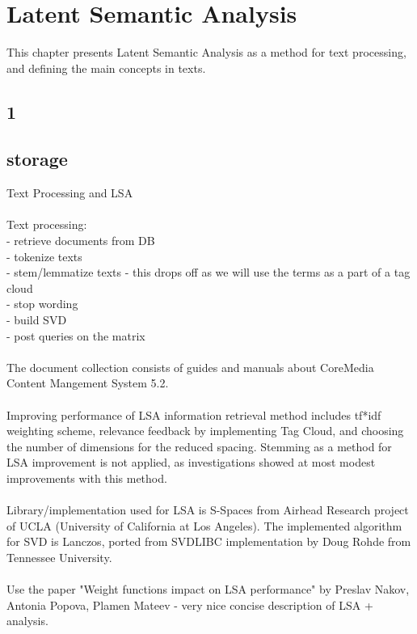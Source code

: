 \chapter{Latent Semantic Analysis}
\label{sec:lsa}

\begin{summary}
This chapter presents Latent Semantic Analysis as a method for text processing, and defining the main concepts in texts.
\end{summary}

\section{1}
\label{sec:lsa:1}

\section{storage}
Text Processing and LSA\\
\\
Text processing:\\
-	retrieve documents from DB\\
-	tokenize texts\\
-	stem/lemmatize texts - this drops off as we will use the terms as a part of a tag cloud\\
-	stop wording\\
-	build SVD\\
-	post queries on the matrix\\
\\
The document collection consists of guides and manuals about CoreMedia Content Mangement System 5.2.\\
\\
Improving performance of LSA information retrieval method includes tf*idf weighting scheme, relevance feedback by implementing Tag Cloud, and choosing the number of dimensions for the reduced spacing. Stemming as a method for LSA improvement is not applied, as investigations showed at most modest improvements with this method.\\
\\
Library/implementation used for LSA is S-Spaces from Airhead Research project of UCLA (University of California at Los Angeles). The implemented algorithm for SVD is Lanczos, ported from SVDLIBC implementation by Doug Rohde from Tennessee University.\\
\\
Use the paper "Weight functions impact on LSA performance" by Preslav Nakov, Antonia Popova, Plamen Mateev - very nice concise description of LSA + analysis.\\
